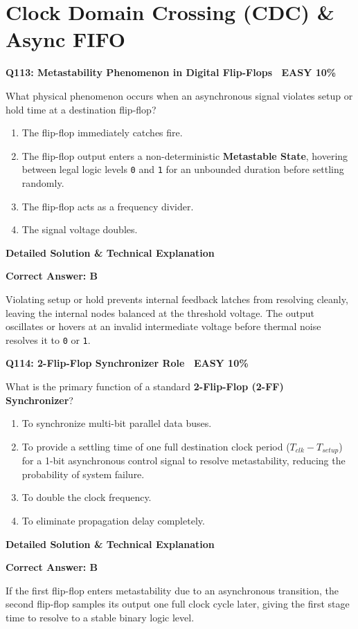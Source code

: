 \documentclass[11pt,a4paper]{article}
\newcommand{\badgeeasy}{{\color{white}\colorbox{easygreen}{\bfseries\sffamily\tiny\ EASY 10\%\ }}}
\newenvironment{qbox}[2]{%
  \begin{mdframed}[style=qstyle]%
  {\bfseries\sffamily\color{primaryblue}#1 \hfill #2}\par\vspace{2pt}%
}{%
  \end{mdframed}%
}
\newenvironment{ansbox}{%
  \begin{mdframed}[style=ansstyle]%
  {\bfseries\sffamily\color{ansgreen}\small Detailed Solution \& Technical Explanation}\par\vspace{2pt}\small%
}{%
  \end{mdframed}%
}
\begin{document}
\section{Clock Domain Crossing (CDC) \& Async FIFO}

\begin{qbox}{Q113: Metastability Phenomenon in Digital Flip-Flops}{\badgeeasy}
What physical phenomenon occurs when an asynchronous signal violates setup or hold time at a destination flip-flop?
\begin{enumerate}[label=\textbf{\Alph*.}]
  \item The flip-flop immediately catches fire.
  \item The flip-flop output enters a non-deterministic \textbf{Metastable State}, hovering between legal logic levels \texttt{0} and \texttt{1} for an unbounded duration before settling randomly.
  \item The flip-flop acts as a frequency divider.
  \item The signal voltage doubles.
\end{enumerate}
\end{qbox}
\begin{ansbox}
\textbf{Correct Answer: B}

Violating setup or hold prevents internal feedback latches from resolving cleanly, leaving the internal nodes balanced at the threshold voltage. The output oscillates or hovers at an invalid intermediate voltage before thermal noise resolves it to \texttt{0} or \texttt{1}.
\end{ansbox}

\begin{qbox}{Q114: 2-Flip-Flop Synchronizer Role}{\badgeeasy}
What is the primary function of a standard \textbf{2-Flip-Flop (2-FF) Synchronizer}?
\begin{enumerate}[label=\textbf{\Alph*.}]
  \item To synchronize multi-bit parallel data buses.
  \item To provide a settling time of one full destination clock period ($T_{clk} - T_{setup}$) for a 1-bit asynchronous control signal to resolve metastability, reducing the probability of system failure.
  \item To double the clock frequency.
  \item To eliminate propagation delay completely.
\end{enumerate}
\end{qbox}
\begin{ansbox}
\textbf{Correct Answer: B}

If the first flip-flop enters metastability due to an asynchronous transition, the second flip-flop samples its output one full clock cycle later, giving the first stage time to resolve to a stable binary logic level.
\end{ansbox}
\end{document}

